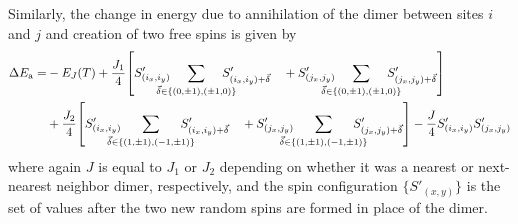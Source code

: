 \documentclass[../thesis_main.tex]{subfiles}
\begin{document}
Similarly, the change in energy due to annihilation of the dimer between sites $i$ and $j$ and creation of two free spins is given by
\begin{align*}
    \Delta E_\text{a} =  & -E_J(T) +\frac{J_1}{4} \qty[S'_{(i_x, i_y)} \!\!\!\!\!\!\!\! \sum_{\vec{\delta} \in \{(0,\pm 1), (\pm 1, 0) \}} \!\!\!\!\!\!\!\! S'_{(i_x, i_y) + \vec{\delta}} \quad + S'_{(j_x, j_y)} \!\!\!\!\!\!\!\! \sum_{\vec{\delta} \in \{(0,\pm 1), (\pm 1, 0) \}} \!\!\!\!\!\!\!\! S'_{(j_x, j_y) + \vec{\delta}}] \\
    & +\frac{J_2}{4} \qty[S'_{(i_x, i_y)} \!\!\!\!\!\!\!\! \sum_{\vec{\delta} \in \{(1,\pm 1), (-1,\pm 1) \}} \!\!\!\!\!\!\!\! S'_{(i_x, i_y) + \vec{\delta}} \quad + S'_{(j_x, j_y)} \!\!\!\!\!\!\!\! \sum_{\vec{\delta} \in \{(1,\pm 1), (-1,\pm 1) \}} \!\!\!\!\!\!\!\! S'_{(j_x, j_y) + \vec{\delta}}] - \frac{J}{4} S'_{(i_x, i_y)} S'_{(j_x, j_y)}
\end{align*}
where again $J$ is equal to $J_1$ or $J_2$ depending on whether it was a nearest or next-nearest neighbor dimer, respectively, and the spin configuration $\{S'_{(x,y)}\}$ is the set of values after the two new random spins are formed in place of the dimer.
\end{document}
